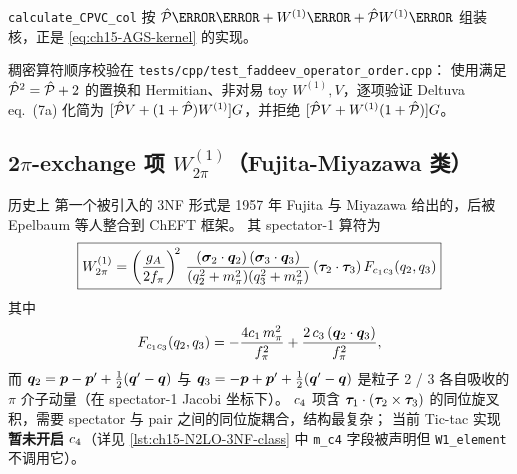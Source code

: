 \texttt{calculate\_CPVC\_col} 按
\(\Pop\V\C + W^{(1)}\C + \Pop W^{(1)}\C\) 组装核，正是
\cref{eq:ch15-AGS-kernel} 的实现。

稠密算符顺序校验在 \texttt{tests/cpp/test\_faddeev\_operator\_order.cpp}：
使用满足 \(\hat{\mathcal{P}}^2=\hat{\mathcal{P}}+2\) 的置换和 Hermitian、非对易 toy
\(W^{(1)},V\)，逐项验证 Deltuva eq.~(7a) 化简为
\([\hat{\mathcal{P}} V+(1+\hat{\mathcal{P}})W^{(1)}]G\)，并拒绝
\([\hat{\mathcal{P}} V+W^{(1)}(1+\hat{\mathcal{P}})]G\)。

\subsection{2\(\pi\)-exchange 项 \(W^{(1)}_{2\pi}\)（Fujita-Miyazawa 类）}
\label{subsec:ch15-2pe}

历史上 \cite{Epelbaum2002NLO3NF} 第一个被引入的 3NF 形式是 1957 年
Fujita 与 Miyazawa 给出的，后被 Epelbaum 等人整合到 ChEFT 框架。
其 spectator-1 算符为
\begin{equation}
\label{eq:ch15-W2pe-op}
\boxed{
W^{(1)}_{2\pi} = \left( \frac{g_A}{2 f_\pi} \right)^{\!2}\,
\frac{(\bm{\sigma}_2 \cdot \bm{q}_2)\,(\bm{\sigma}_3 \cdot \bm{q}_3)}
     {(q_2^2 + m_\pi^2)(q_3^2 + m_\pi^2)}\,
(\bm{\tau}_2 \cdot \bm{\tau}_3)\,
F_{c_1 c_3}(q_2, q_3)
}
\end{equation}
其中
\begin{equation}
\label{eq:ch15-F-c1c3}
F_{c_1 c_3}(q_2, q_3) = -\frac{4 c_1\, m_\pi^2}{f_\pi^2} + \frac{2\, c_3\,
(\bm{q}_2 \cdot \bm{q}_3)}{f_\pi^2},
\end{equation}
而 \(\bm{q}_2 = \bm{p} - \bm{p}' + \tfrac{1}{2}(\bm{q}' - \bm{q})\)
与 \(\bm{q}_3 = -\bm{p} + \bm{p}' + \tfrac{1}{2}(\bm{q}' - \bm{q})\)
是粒子 2 / 3 各自吸收的 \(\pi\) 介子动量（在 spectator-1 Jacobi 坐标下）。
\(c_4\) 项含 \(\bm{\tau}_1 \cdot (\bm{\tau}_2 \times \bm{\tau}_3)\)
的同位旋叉积，需要 spectator 与 pair 之间的同位旋耦合，结构最复杂；
当前 Tic-tac 实现\textbf{暂未开启 \(c_4\)}（详见 \cref{lst:ch15-N2LO-3NF-class}
中 \texttt{m\_c4} 字段被声明但 \texttt{W1\_element} 不调用它）。

